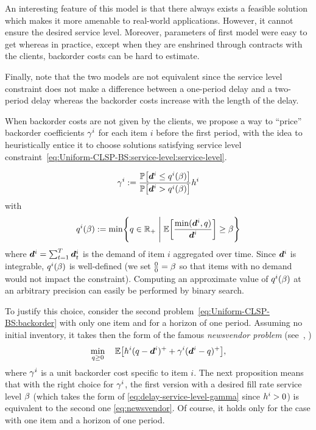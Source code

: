An interesting feature of this model is that there always exists a feasible solution which makes it more amenable to real-world applications. However, it cannot ensure the desired service level. Moreover, parameters of first model were easy to get whereas in practice, except when they are enshrined through contracts with the clients, backorder costs can be hard to estimate.

Finally, note that the two models are not equivalent since the service level constraint does not make a difference between a one-period delay and a two-period delay whereas the backorder costs increase with the length of the delay.

\medskip

When backorder costs are not given by the clients, we propose a way to ``price'' backorder coefficients $\gamma^i$ for each item $i$ before the first period, with the idea to heuristically entice it to choose solutions satisfying service level constraint~\eqref{eq:Uniform-CLSP-BS:service-level:service-level}.

\begin{equation}
\backorder^i := \frac{\prob\sqbracket{\va\demand^i \le q^i(\servicelvl)}}{\prob\sqbracket{\va\demand^i>q^i(\servicelvl)}} \holding^i
\label{eq:delay-service-level-gamma}
\end{equation}
with
\begin{equation}
\quantity^i(\servicelvl) :=
\min \crbracket{
  \quantity\in \RR_+ \; \Bigg| \; \espe\sqbracket{\frac{\min(\va\demand^i,\quantity)}{\va\demand^i}} \ge \servicelvl
}
\label{eq:delay-service-level-ell}
\end{equation}
where $\va\demand^i = \sum_{t=1}^{\horizon} \va \demand_t^i$ is the demand of item $i$ aggregated over time. Since $\va \demand^i$ is integrable, $q^i(\beta)$ is well-defined
(we set $\frac{0}{0}=\beta$ so that items with no demand would not impact the constraint).
Computing an approximate value of $q^i(\beta)$ at an arbitrary precision can easily be performed by binary search.


To justify this choice, consider the second problem~\eqref{eq:Uniform-CLSP-BS:backorder} with only one item and for a horizon of one period. Assuming no initial inventory, it takes then the form of the famous \emph{newsvendor problem} (see~\eg, \cite[Chapter 1]{Shapiro2009})
\begin{equation}
\label{eq:newsvendor}
\min_{\quantity\ge 0} \quad \espe\sqbracket{\holding^i (\quantity - \va \demand^i )^+ + \backorder^i ( \va\demand^i - \quantity)^+},
\end{equation}
where $\gamma^i$ is a unit backorder cost specific to item $i$.
The next proposition means that with the right choice for $\gamma^i$, the first version with a desired fill rate service level $\beta$ (which takes the form of \eqref{eq:delay-service-level-gamma} since $h^i>0$) is equivalent to the second one \eqref{eq:newsvendor}. Of course, it holds only for the case with one item and a horizon of one period.

